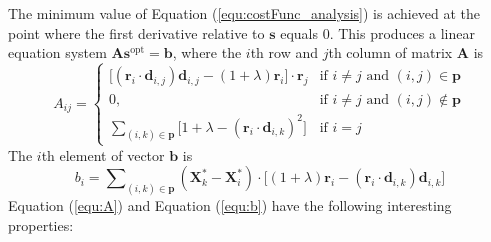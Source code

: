 The minimum value of Equation (\ref{equ:costFunc_analysis}) is achieved at the point where the first derivative relative to $\mathbf{s}$ equals 0. This produces a linear equation system $\mathbf{A}\mathbf{s}^\text{opt}= \mathbf{b}$, where the $i$th row and $j$th column of matrix $\mathbf{A}$ is
\begin{equation}
A_{ij}= \begin{cases}
\lbrack(\mathbf{r}_i\cdot\mathbf{d}_{i,j})\mathbf{d}_{i,j}-(1+\lambda)\mathbf{r}_i\rbrack\cdot\mathbf{r}_j  & \text{if } i\neq j \text{ and } (i,j)\in \mathbf{p}\\
0, & \text{if } i\neq j \text{ and } (i,j)\notin \mathbf{p}\\
\sum_{(i,k)\in{\mathbf{p}}}{\lbrack 1+\lambda - (\mathbf{r}_i\cdot\mathbf{d}_{i,k})^2 \rbrack } & \text{if } i=j
\end{cases}
\label{equ:A}
\end{equation}
The $i$th element of vector $\mathbf{b}$ is
\begin{equation}
b_i=\sum\nolimits_{(i,k)\in{\mathbf{p}}}(\mathbf{X}_k^*-\mathbf{X}_i^*)\cdot \lbrack(1+\lambda)\mathbf{r}_i - (\mathbf{r}_i\cdot \mathbf{d}_{i,k})\mathbf{d}_{i,k} \rbrack
\label{equ:b}
\end{equation}
Equation (\ref{equ:A}) and Equation (\ref{equ:b}) have the following interesting properties:


